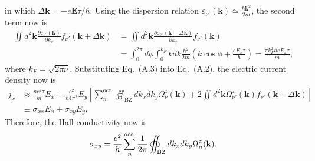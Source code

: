in which $\Delta \mathbf{k} = -e \mathbf{E} \tau / \hbar$. Using the dispersion relation $\varepsilon_{\nu'}(\mathbf{k}) \simeq \frac{\hbar \mathbf{k}^{2}}{2m}$, the second term now is
\begin{equation}
	\begin{aligned}
		\iint d^{2} \mathbf{k} \frac{\partial \varepsilon_{\nu'}(\mathbf{k})}{\partial k_{x}} f_{\nu'}(\mathbf{k} + \Delta \mathbf{k}) &= \iint d^{2} \mathbf{k} \frac{\partial \varepsilon_{\nu'} (\mathbf{k} - \Delta \mathbf{k})}{\partial k_{x}} f_{\nu'}(\mathbf{k})\\
		&= \int_{0}^{2 \pi} d\phi \int_{0}^{k_{F}} k dk \frac{\hbar^{2}}{2m} \left( k \cos \phi + \frac{e E_{x} \tau}{\hbar} \right) = \frac{\pi k_{F}^{2} \hbar e E_{x} \tau}{m},
	\end{aligned}
\end{equation}
where $k_{F} = \sqrt{2 \pi \nu}$. Substituting Eq.~(A.3) into Eq.~(A.2), the electric current density now is 
\begin{equation}
	\begin{aligned}
		j_{x} &\approx \frac{n e^{2} \tau}{m} E_{x} + \frac{e^{2}}{\hbar 4 \pi^{2}} E_{y} \left[ \sum_{n}^{\text{occ.}} \oiint_{\text{BZ}} dk_{x} dk_{y} \Omega_{\nu}^{z}(\mathbf{k}) + 2 \iint d^{2} \mathbf{k} \Omega_{\nu'}^{z}(\mathbf{k}) f_{\nu'}(\mathbf{k} + \Delta \mathbf{k}) \right]\\
		& \equiv \sigma_{xx} E_{x} + \sigma_{xy} E_{y}.
	\end{aligned}
\end{equation}
Therefore, the Hall conductivity now is
\begin{gather}
	\sigma_{xy} = \dfrac{e^{2}}{h} \sum_{n}^{\text{occ.}} \dfrac{1}{2\pi} \displaystyle\oiint_{\text{{BZ}}} d k_{x} d k_{y} \Omega_{n}^{z} (\mathbf{k}).
\end{gather}



